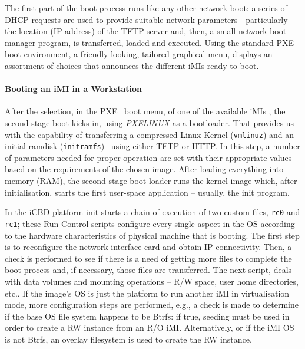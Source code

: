 The first part of the boot process runs like any other network boot: a series of DHCP requests are used to provide suitable network parameters - particularly the location (IP address) of the TFTP server and, then, a small network boot manager program, is transferred, loaded and executed. Using the standard PXE boot environment, a friendly looking, tailored graphical menu, displays an assortment of choices that announces the different iMIs ready to boot.

\paragraph{Booting an iMI in a Workstation}
\label{subsub:icbd_booting_imi}

After the selection, in the PXE~\cite{ibm_linux_boot} boot menu, of one of the available iMIs , the second-stage boot kicks in, using \textit{PXELINUX} as a bootloader. That provides us with the capability of transferring a compressed Linux Kernel (\texttt{vmlinuz}) and an initial ramdisk (\texttt{initramfs})~\cite{ibm_initrd} using either TFTP or HTTP. In this step, a number of parameters needed for proper operation are set with their appropriate values based on the requirements of the chosen image. After loading everything into memory (RAM), the second-stage boot loader runs the kernel image which, after initialisation, starts the first user-space application – usually, the init program.

In the iCBD platform init starts a chain of execution of two custom files, \texttt{rc0} and \texttt{rc1}; these Run Control scripts configure every single aspect in the OS according to the hardware characteristics of physical machine that is booting. The first step is to reconfigure the network interface card and obtain IP connectivity. Then, a check is performed to see if there is a need of getting more files to complete the boot process and, if necessary, those files are transferred. The next script, deals with data volumes and mounting operations – R/W space, user home directories, etc.. If the image’s OS is just the platform to run another iMI in virtualisation mode, more configuration steps are performed, e.g., a check is made to determine if the base OS file system happens to be Btrfs: if true, seeding must be used in order to create a R\/W instance from an R/O iMI. Alternatively, or if the iMI OS is not Btrfs, an overlay filesystem is used to create the R\/W instance.

